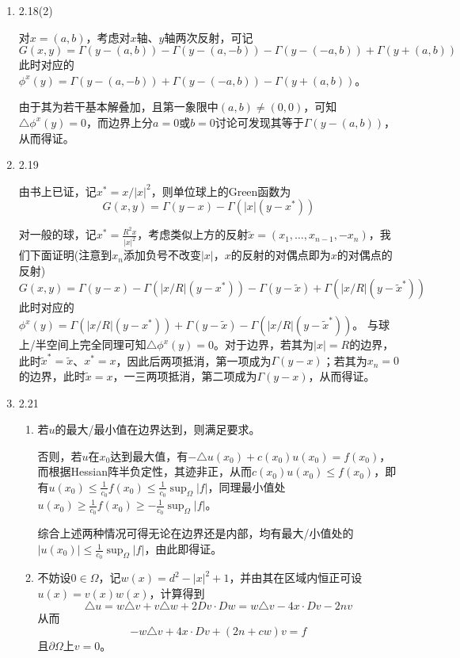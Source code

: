 \documentclass[a4paper,UTF8,fontset=windows,10pt]{ctexart}
\begin{document}
\begin{enumerate}
    \item 2.18(2)
    
    对$x=(a,b)$，考虑对$x$轴、$y$轴两次反射，可记
    $$G(x,y)=\Gamma(y-(a,b))-\Gamma(y-(a,-b))-\Gamma(y-(-a,b))+\Gamma(y+(a,b))$$
    此时对应的$\phi^x(y)=\Gamma(y-(a,-b))+\Gamma(y-(-a,b))-\Gamma(y+(a,b))$。
    
    由于其为若干基本解叠加，且第一象限中$(a,b)\ne(0,0)$，可知$\triangle\phi^x(y)=0$，而边界上分$a=0$或$b=0$讨论可发现其等于$\Gamma(y-(a,b))$，从而得证。
    
    \item 2.19
    
    由书上已证，记$x^*=x/|x|^2$，则单位球上的Green函数为
    $$G(x,y)=\Gamma(y-x)-\Gamma(|x|(y-x^*))$$
    
    
    对一般的球，记$x^*=\frac{R^2x}{|x|^2}$，考虑类似上方的反射$\tilde{x}=(x_1,\dots,x_{n-1},-x_n)$，我们下面证明(注意到$x_n$添加负号不改变$|x|$，$x$的反射的对偶点即为$x$的对偶点的反射)
    $$G(x,y)=\Gamma(y-x)-\Gamma(|x/R|(y-x^*))-\Gamma(y-\tilde{x})+\Gamma(|x/R|(y-\tilde{x}^*))$$
    此时对应的$\phi^x(y)=\Gamma(|x/R|(y-x^*))+\Gamma(y-\tilde{x})-\Gamma(|x/R|(y-\tilde{x}^*))$。
    与球上/半空间上完全同理可知$\triangle\phi^x(y)=0$。对于边界，若其为$|x|=R$的边界，此时$\tilde{x}^*=\tilde{x}$、$x^*=x$，因此后两项抵消，第一项成为$\Gamma(y-x)$；若其为$x_n=0$的边界，此时$\tilde{x}=x$，一三两项抵消，第二项成为$\Gamma(y-x)$，从而得证。
    
    \item 2.21
    \begin{enumerate}[(1)]
        \item 若$u$的最大/最小值在边界达到，则满足要求。
        
        否则，若$u$在$x_0$达到最大值，有$-\triangle u(x_0)+c(x_0)u(x_0)=f(x_0)$，而根据Hessian阵半负定性，其迹非正，从而$c(x_0)u(x_0)\le f(x_0)$，即有$u(x_0)\le\frac{1}{c_0}f(x_0)\le\frac{1}{c_0}\sup_\Omega|f|$，同理最小值处$u(x_0)\ge\frac{1}{c_0}f(x_0)\ge-\frac{1}{c_0}\sup_\Omega|f|$。
        
        综合上述两种情况可得无论在边界还是内部，均有最大/小值处的$|u(x_0)|\le\frac{1}{c_0}\sup_\Omega|f|$，由此即得证。
    
        \item 不妨设$0\in\Omega$，记$w(x)=d^2-|x|^2+1$，并由其在区域内恒正可设$u(x)=v(x)w(x)$，计算得到
        $$\triangle u=w\triangle v+v\triangle w+2Dv\cdot Dw=w\triangle v-4x\cdot Dv-2nv$$
        从而
        $$-w\triangle v+4x\cdot Dv+(2n+cw)v=f$$
        且$\partial\Omega$上$v=0$。
    

\end{enumerate}
\end{enumerate}
\end{document}
